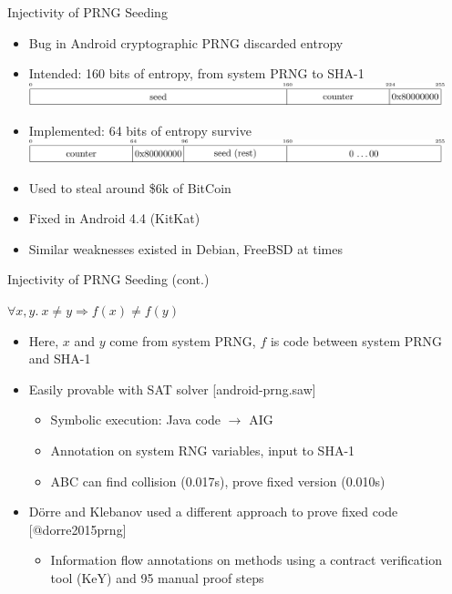 \documentclass[ignorenonframetext,]{beamer}
\providecommand{\tightlist}{%
  \setlength{\itemsep}{0pt}\setlength{\parskip}{0pt}}
\newcommand{\infile}[1]{{\tiny \alert{[#1]}}}
\begin{document}
\begin{frame}{Injectivity of PRNG Seeding}

\begin{itemize}
\tightlist
\item
  Bug in Android cryptographic PRNG discarded entropy
\item
  Intended: 160 bits of entropy, from system PRNG to SHA-1
  \includegraphics[width=0.95\textwidth]{images/prng-intended.pdf}
\item
  Implemented: 64 bits of entropy survive
  \includegraphics[width=0.95\textwidth]{images/prng-buggy.pdf}
\item
  Used to steal around \$6k of BitCoin
\item
  Fixed in Android 4.4 (KitKat)
\item
  Similar weaknesses existed in Debian, FreeBSD at times
\end{itemize}

\end{frame}

\begin{frame}{Injectivity of PRNG Seeding (cont.)}

\begin{center}
$\forall x, y.~x \neq y \Rightarrow f(x) \neq f(y)$
\end{center}

\begin{itemize}
\tightlist
\item
  Here, \(x\) and \(y\) come from system PRNG, \(f\) is code between
  system PRNG and SHA-1
\item
  Easily provable with SAT solver \infile{android-prng.saw}

  \begin{itemize}
  \tightlist
  \item
    Symbolic execution: Java code \(\rightarrow\) AIG
  \item
    Annotation on system RNG variables, input to SHA-1
  \item
    ABC can find collision (0.017s), prove fixed version (0.010s)
  \end{itemize}
\item
  Dörre and Klebanov used a different approach to prove fixed code
  {[}@dorre2015prng{]}

  \begin{itemize}
  \tightlist
  \item
    Information flow annotations on methods using a contract
    verification tool (KeY) and 95 manual proof steps
  \end{itemize}
\end{itemize}

\end{frame}
\end{document}
